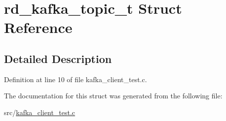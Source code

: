 \hypertarget{structrd__kafka__topic__t}{\section{rd\-\_\-kafka\-\_\-topic\-\_\-t \-Struct \-Reference}
\label{structrd__kafka__topic__t}
}


\subsection{\-Detailed \-Description}


\-Definition at line 10 of file kafka\-\_\-client\-\_\-test.\-c.



\-The documentation for this struct was generated from the following file\-:\begin{DoxyCompactItemize}
\item 
src/\hyperlink{kafka__client__test_8c}{kafka\-\_\-client\-\_\-test.\-c}\end{DoxyCompactItemize}
